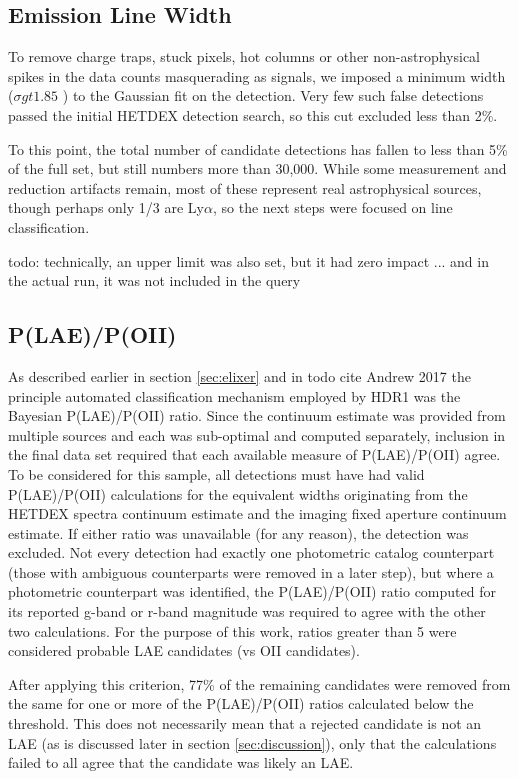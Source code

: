\documentclass{aastex62}
\begin{document}
\subsection{Emission Line Width}
To remove charge traps, stuck pixels, hot columns or other non-astrophysical spikes in the data counts masquerading as signals, we imposed a minimum width ($\sigma gt 1.85$ ) to the Gaussian fit on the detection. Very few such false detections passed the initial HETDEX detection search, so this cut excluded less than 2\%. 

To this point, the total number of candidate detections has fallen to less than 5\% of the full set, but still numbers more than 30,000. While some measurement and reduction artifacts remain, most of these represent real astrophysical sources, though perhaps only 1/3 are Ly$\alpha$, so the next steps were focused on line classification. 

{ \color{red} todo: technically, an upper limit was also set, but it had zero impact ... and in the actual run, it was not included in the query}


\subsection{P(LAE)/P(OII)}

As described earlier in section \ref{sec:elixer} and in {\color{red} todo cite Andrew 2017} the principle automated classification mechanism employed by HDR1 was the Bayesian P(LAE)/P(OII) ratio. Since the continuum estimate was provided from multiple sources and each was sub-optimal and computed separately, inclusion in the final data set required that each available measure of P(LAE)/P(OII) agree. To be considered for this sample, all detections must have had valid P(LAE)/P(OII) calculations for the equivalent widths originating from the HETDEX spectra continuum estimate and the imaging fixed aperture continuum estimate. If either ratio was unavailable (for any reason), the detection was excluded. Not every detection had exactly one photometric catalog counterpart (those with ambiguous counterparts were removed in a later step), but where a photometric counterpart was identified, the P(LAE)/P(OII) ratio computed for its reported g-band or r-band magnitude was required to agree with the other two calculations. For the purpose of this work, ratios greater than 5 were considered probable LAE candidates (vs OII candidates).

After applying this criterion, 77\% of the remaining candidates were removed from the same for one or more of the P(LAE)/P(OII) ratios calculated below the threshold. This does not necessarily mean that a rejected candidate is not an LAE (as is discussed later in section \ref{sec:discussion}), only that the calculations failed to all agree that the candidate was likely an LAE.
\end{document}
